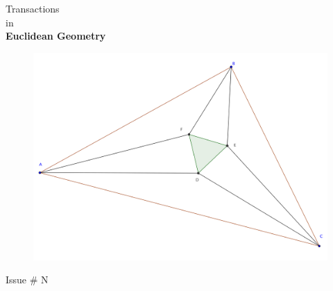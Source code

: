 \documentclass{report}
\begin{document}
\thispagestyle{empty}
\begin{center}
{\Huge Transactions\\ in\\[.2in] \textbf{Euclidean Geometry}}
\vspace{1in}

\begin{figure}[h!]
\includegraphics[width=1.1\textwidth]{cover-image.png}
\end{figure}

\vspace{1in}

{\Huge Issue \# N}
\end{center}

\clearpage
\end{document}
